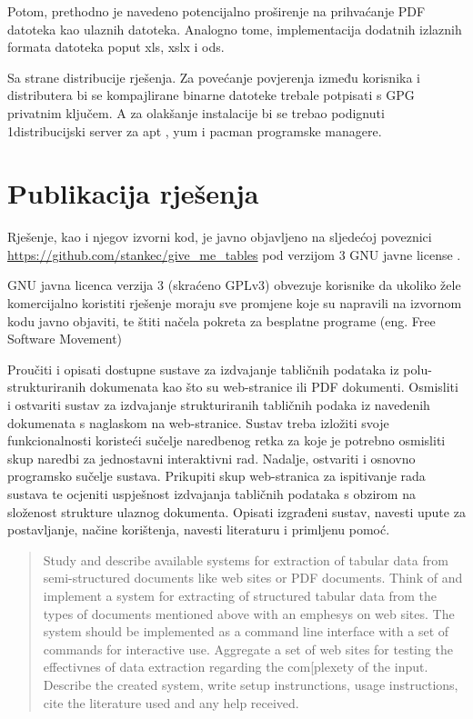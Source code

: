 \documentclass[times, utf8, zavrsni]{fer}
\begin{document}
Potom, prethodno je navedeno potencijalno proširenje na prihvaćanje PDF
datoteka kao ulaznih datoteka. Analogno tome, implementacija dodatnih
izlaznih formata datoteka poput xls, xslx i ods.

Sa strane distribucije rješenja. Za povećanje povjerenja između korisnika i
distributera bi se kompajlirane binarne datoteke trebale potpisati s GPG
privatnim ključem. A za olakšanje instalacije bi se trebao podignuti
1distribucijski server za apt \cite{apt_wiki}, yum \cite{yum_wiki} i
pacman \cite{pacman_wiki} programske managere.

\section{Publikacija rješenja}

Rješenje, kao i njegov izvorni kod, je javno objavljeno na sljedećoj
poveznici \url{https://github.com/stankec/give_me_tables} pod verzijom 3 GNU
javne license \cite{gplv3_license}.

GNU javna licenca verzija 3 (skraćeno GPLv3) obvezuje korisnike da ukoliko
žele komercijalno koristiti rješenje moraju sve promjene koje su napravili na
izvornom kodu javno objaviti, te štiti načela pokreta za besplatne programe
\cite{free_software_movement_manifesto} (eng. Free Software Movement)





\begin{sazetak}

Proučiti i opisati dostupne sustave za izdvajanje tabličnih podataka iz
polu-strukturiranih dokumenata kao što su web-stranice ili PDF dokumenti.
Osmisliti i ostvariti sustav za izdvajanje strukturiranih tabličnih podaka iz
navedenih dokumenata s naglaskom na web-stranice.
Sustav treba izložiti svoje funkcionalnosti koristeći sučelje naredbenog retka
za koje je potrebno osmisliti skup naredbi za jednostavni interaktivni rad.
Nadalje, ostvariti i osnovno programsko sučelje sustava. Prikupiti skup
web-stranica za ispitivanje rada sustava te ocjeniti uspješnost izdvajanja
tabličnih podataka s obzirom na složenost strukture ulaznog dokumenta. Opisati
izgrađeni sustav, navesti upute za postavljanje, načine korištenja, navesti
literaturu i primljenu pomoć.

\kljucnerijeci{}
\end{sazetak}

\begin{abstract}

Study and describe available systems for extraction of tabular data from
semi-structured documents like web sites or PDF documents. Think of and
implement a system for extracting of structured tabular data from the types of
documents mentioned above with an emphesys on web sites.
The system should be implemented as a command line interface with a set of
commands for interactive use. Aggregate a set of web sites for testing the
effectivnes of data extraction regarding the com[plexety of the input.
Describe the created system, write setup instrunctions, usage instructions,
cite the literature used and any help received.

\keywords{}
\end{abstract}
\end{document}
